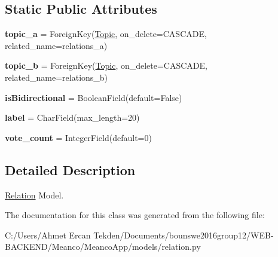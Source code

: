 \subsection*{Static Public Attributes}
\begin{DoxyCompactItemize}
\item 
\hypertarget{class_meanco_app_1_1models_1_1relation_1_1_relation_a0b97c1d523ffe93ae7e6fcb88fe3494d}{}\label{class_meanco_app_1_1models_1_1relation_1_1_relation_a0b97c1d523ffe93ae7e6fcb88fe3494d} 
{\bfseries topic\+\_\+a} = Foreign\+Key(\hyperlink{class_meanco_app_1_1models_1_1topic_1_1_topic}{Topic}, on\+\_\+delete=C\+A\+S\+C\+A\+DE, related\+\_\+name=\textquotesingle{}relations\+\_\+a\textquotesingle{})
\item 
\hypertarget{class_meanco_app_1_1models_1_1relation_1_1_relation_ab10723f819805b2be0fba7f0abb574db}{}\label{class_meanco_app_1_1models_1_1relation_1_1_relation_ab10723f819805b2be0fba7f0abb574db} 
{\bfseries topic\+\_\+b} = Foreign\+Key(\hyperlink{class_meanco_app_1_1models_1_1topic_1_1_topic}{Topic}, on\+\_\+delete=C\+A\+S\+C\+A\+DE, related\+\_\+name=\textquotesingle{}relations\+\_\+b\textquotesingle{})
\item 
\hypertarget{class_meanco_app_1_1models_1_1relation_1_1_relation_affb97d96beee3adb03ba1bbfb8e4e9e7}{}\label{class_meanco_app_1_1models_1_1relation_1_1_relation_affb97d96beee3adb03ba1bbfb8e4e9e7} 
{\bfseries is\+Bidirectional} = Boolean\+Field(default=False)
\item 
\hypertarget{class_meanco_app_1_1models_1_1relation_1_1_relation_a8da0c13997963b36c25368c15204d46a}{}\label{class_meanco_app_1_1models_1_1relation_1_1_relation_a8da0c13997963b36c25368c15204d46a} 
{\bfseries label} = Char\+Field(max\+\_\+length=20)
\item 
\hypertarget{class_meanco_app_1_1models_1_1relation_1_1_relation_a15904e66fc5a727eaa78bcc7e3209f12}{}\label{class_meanco_app_1_1models_1_1relation_1_1_relation_a15904e66fc5a727eaa78bcc7e3209f12} 
{\bfseries vote\+\_\+count} = Integer\+Field(default=0)
\end{DoxyCompactItemize}


\subsection{Detailed Description}
\hyperlink{class_meanco_app_1_1models_1_1relation_1_1_relation}{Relation} Model. 

The documentation for this class was generated from the following file\+:\begin{DoxyCompactItemize}
\item 
C\+:/\+Users/\+Ahmet Ercan Tekden/\+Documents/bounswe2016group12/\+W\+E\+B-\/\+B\+A\+C\+K\+E\+N\+D/\+Meanco/\+Meanco\+App/models/relation.\+py\end{DoxyCompactItemize}
